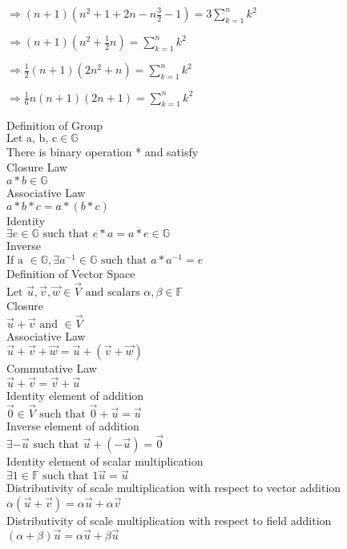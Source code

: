 \documentclass[10pt]{article}
\begin{document}
$\Rightarrow (n+1)( n^2+1+2n-n\frac{3}{2} - 1) = 3\sum_{k=1}^{n} k^2 $	

$\Rightarrow (n+1)(n^2 + \frac{1}{2}n) = \sum_{k=1}^{n} k^2$

$\Rightarrow \frac{1}{2}(n+1)(2n^2+n)=\sum_{k=1}^{n} k^2$

$\Rightarrow \frac{1}{6}n(n+1)(2n+1) = \sum_{k=1}^{n} k^2 $

\pagebreak
Definition of Group\\
$\text{Let a, b, c} \in \mathbb{G} $\\
There is binary operation * and satisfy\\

Closure Law\\
$ a*b \in \mathbb{G} $\\

Associative Law\\
$ a*b*c = a*(b*c)$\\

Identity\\
$ \exists \mathit{e} \in \mathbb{G} \text{ such that } \mathit{e}*a = a*\mathit{e} \in \mathbb{G}$\\

Inverse\\
$ \text{If a } \in \mathbb{G}, \exists a^{-1} \in \mathbb{G} \text{ such that } a*a^{-1} = e $\\

Definition of Vector Space\\
$\text{Let }\vec{u}, \vec{v}, \vec{w} \in \vec{V} \text{ and scalars } \alpha, \beta \in \mathbb{F}$\\
Closure\\
$\vec{u} + \vec{v} \text{ and } \in \vec{V}$\\
Associative Law\\
$\vec{u} + \vec{v} + \vec{w} = \vec{u} + (\vec{v} + \vec{w})$\\
Commutative Law\\
$\vec{u} + \vec{v} = \vec{v} + \vec{u} $\\
Identity element of addition\\
$\vec{0} \in \vec{V} \text{ such that } \vec{0} + \vec{u} = \vec{u}$\\
Inverse element of addition\\
$\exists -\vec{u} \text{ such that } \vec{u} + (-\vec{u}) = \vec{0}$\\
Identity element of scalar multiplication\\
$\exists \mathit{1} \in \mathbb{F} \text{ such that } \mathit{1}\vec{u} = \vec{u}$\\
Distributivity of scale multiplication with respect to vector addition\\
$\alpha(\vec{u} + \vec{v}) = \alpha\vec{u} + \alpha\vec{v}$\\
Distributivity of scale multiplication with respect to field addition\\
$(\alpha + \beta)\vec{u} = \alpha\vec{u} + \beta\vec{u}$\\
\end{document}
